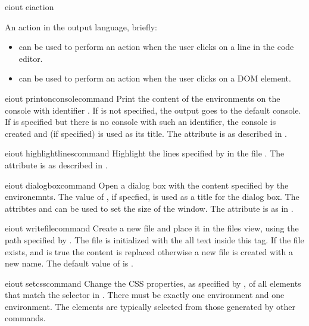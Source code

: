 \bigskip
\xmlstruct
{eiout}
{eiaction}
{%
An action in the \ei output language, briefly:
\begin{itemize}
%
\item {} can be used to perform an action
  when the user clicks on a line in the code editor.
%
\item {} can be used to perform an action
  when the user clicks on a DOM element.
%
\end{itemize}
}


\bigskip
\xmlstruct
{eiout}
{printonconsolecommand}
{%
%
  Print the content of the  environments on the
  console with identifier .
%
  If  is not specified, the output goes to
  the default console.
%
  If  is specified but there is no console
  with such an identifier, the console is created and
   (if specified) is used as its title.
%
  The attribute  is as described in
  .
%
} 

\bigskip
\xmlstruct
{eiout}
{highlightlinescommand}
{%
%
  Highlight the lines specified by  in the file
  . The attribute  is as
  described in .
%
}


\bigskip
\xmlstruct
{eiout}
{dialogboxcommand}
{%
  Open a dialog box with the content specified by the
   environemnts. The value of
  , if specfied, is used as a title for the
  dialog box. The attribtes  and
   can be used to set the size of the window.
  The attribute  is as in
  .
%
}


\bigskip 
\xmlstruct 
{eiout}
{writefilecommand} 
{%
%
  Create a new file and place it in the files view, using the path
  specified by . The file is initialized with
  the all text  inside this tag. If the file
  exists, and  is true the content is
  replaced otherwise a new file is created with a new name. The
  default value of  is
  .
% 
%
}


\bigskip
\xmlstruct
{eiout}
{setcsscommand}
{%
%
  Change the CSS properties, as specified by
  , of all elements that match the
  selector in .
%
  There must be exactly one  environment and
  one  environment. 
%
  The elements are typically selected from those generated by other
  commands.
%
}


